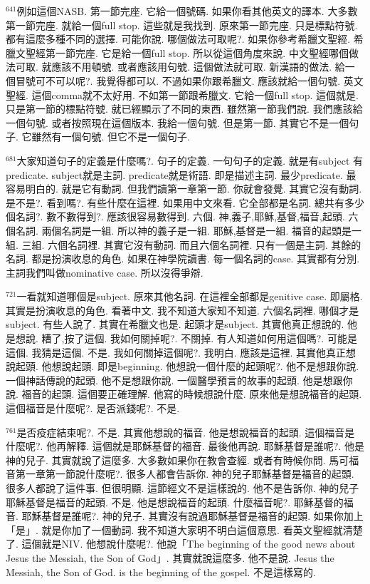 \documentclass{book}
\begin{document}
$^{641}$例如這個NASB.
第一節完座.
它給一個號碼.
如果你看其他英文的譯本.
大多數第一節完座.
就給一個full stop.
這些就是我找到.
原來第一節完座.
只是標點符號.
都有這麼多種不同的選擇.
可能你說.
哪個做法可取呢?.
如果你參考希臘文聖經.
希臘文聖經第一節完座.
它是給一個full stop.
所以從這個角度來說.
中文聖經哪個做法可取.
就應該不用頓號.
或者應該用句號.
這個做法就可取.
新漢語的做法.
給一個冒號可不可以呢?.
我覺得都可以.
不過如果你跟希臘文.
應該就給一個句號.
英文聖經.
這個comma就不太好用.
不如第一節跟希臘文.
它給一個full stop.
這個就是.
只是第一節的標點符號.
就已經顯示了不同的東西.
雖然第一節我們說.
我們應該給一個句號.
或者按照現在這個版本.
我給一個句號.
但是第一節.
其實它不是一個句子.
它雖然有一個句號.
但它不是一個句子.

$^{681}$大家知道句子的定義是什麼嗎?.
句子的定義.
一句句子的定義.
就是有subject 有predicate.
subject就是主詞.
predicate就是術語.
即是描述主詞.
最少predicate.
最容易明白的.
就是它有動詞.
但我們讀第一章第一節.
你就會發覺.
其實它沒有動詞.
是不是?.
看到嗎?.
有些什麼在這裡.
如果用中文來看.
它全部都是名詞.
總共有多少個名詞?.
數不數得到?.
應該很容易數得到.
六個.
神,義子,耶穌,基督,福音,起頭.
六個名詞.
兩個名詞是一組.
所以神的義子是一組.
耶穌,基督是一組.
福音的起頭是一組.
三組.
六個名詞裡.
其實它沒有動詞.
而且六個名詞裡.
只有一個是主詞.
其餘的名詞.
都是扮演收息的角色.
如果在神學院讀書.
每一個名詞的case.
其實都有分別.
主詞我們叫做nominative case.
所以沒得爭辯.

$^{721}$一看就知道哪個是subject.
原來其他名詞.
在這裡全部都是genitive case.
即屬格.
其實是扮演收息的角色.
看著中文.
我不知道大家知不知道.
六個名詞裡.
哪個才是subject.
有些人說了.
其實在希臘文也是.
起頭才是subject.
其實他真正想說的.
他是想說.
糟了,按了這個.
我如何關掉呢?.
不關掉.
有人知道如何用這個嗎?.
可能是這個.
我猜是這個.
不是.
我如何關掉這個呢?.
我明白.
應該是這裡.
其實他真正想說起頭.
他想說起頭.
即是beginning.
他想說一個什麼的起頭呢?.
他不是想跟你說.
一個神話傳說的起頭.
他不是想跟你說.
一個醫學預言的故事的起頭.
他是想跟你說.
福音的起頭.
這個要正確理解.
他寫的時候想說什麼.
原來他是想說福音的起頭.
這個福音是什麼呢?.
是否派錢呢?.
不是.

$^{761}$是否疫症結束呢?.
不是.
其實他想說的福音.
他是想說福音的起頭.
這個福音是什麼呢?.
他再解釋.
這個就是耶穌基督的福音.
最後他再說.
耶穌基督是誰呢?.
他是神的兒子.
其實就說了這麼多.
大多數如果你在教會查經.
或者有時候你問.
馬可福音第一章第一節說什麼呢?.
很多人都會告訴你.
神的兒子耶穌基督是福音的起頭.
很多人都說了這件事.
但很明顯.
這節經文不是這樣說的.
他不是告訴你.
神的兒子耶穌基督是福音的起頭.
不是.
他是想說福音的起頭.
什麼福音呢?.
耶穌基督的福音.
耶穌基督是誰呢?.
神的兒子.
其實沒有說過耶穌基督是福音的起頭.
如果你加上「是」.
就是你加了一個動詞.
我不知道大家明不明白這個意思.
看英文聖經就清楚了.
這個就是NIV.
他想說什麼呢?.
他說「The beginning of the good news about Jesus the Messiah, the Son of God」.
其實就說這麼多.
他不是說.
Jesus the Messiah, the Son of God.
is the beginning of the gospel.
不是這樣寫的.
\end{document}
